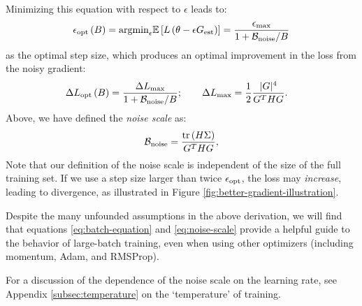 \documentclass[english]{article}
\newcommand{\CB}{{\cal B}}
\begin{document}
Minimizing this equation with respect to $\epsilon$ leads to:
\begin{equation}
\epsilon_{\mathrm{opt}}\left(B\right)={\rm argmin}_{\epsilon}\mathbb{E}\left[L\left(\theta-\epsilon G_{{\rm est}}\right)\right]=\frac{\epsilon_{{\rm max}}}{1+\mathcal{B}_{{\rm noise}}/{B}}\label{eq:OptimalStepwithNoise}
\end{equation}
as the optimal step size, which produces an optimal improvement in the loss from the noisy gradient:
\begin{align}
\Delta L_{\mathrm{opt}}\left(B\right) & =\frac{\Delta L_{{\rm max}}}{1+\mathcal{B}_{{\rm noise}}/{B}};\qquad\Delta L_{{\rm max}}=\frac{1}{2}\frac{|G|^{4}}{G^{T}HG}.\label{eq:batch-equation}
\end{align}
Above, we have defined the \textit{noise scale }as:
\begin{equation}
\mathcal{B}_{{\rm noise}}=\frac{{\rm tr}\left(H\Sigma\right)}{G^{T}HG},\label{eq:noise-scale}
\end{equation}
Note that our definition of the noise scale is independent of the size of the full training set.  If we use a step size larger than twice $\epsilon_{{\rm opt}}$, the loss may \emph{increase}, leading to divergence, as illustrated in Figure \ref{fig:better-gradient-illustration}.

Despite the many unfounded assumptions in the above derivation, we will find that equations \ref{eq:batch-equation} and \ref{eq:noise-scale} provide a helpful guide to the behavior of large-batch training, even when using other optimizers (including momentum, Adam, and RMSProp).

For a discussion of the dependence of the noise scale on the learning rate, see  Appendix \ref{subsec:temperature} on the `temperature' of training.

\end{document}
